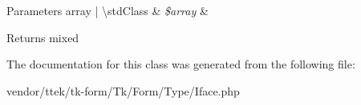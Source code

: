\begin{DoxyParams}[1]{Parameters}
array | \textbackslash{}std\+Class & {\em \$array} & \\
\hline
\end{DoxyParams}
\begin{DoxyReturn}{Returns}
mixed 
\end{DoxyReturn}


The documentation for this class was generated from the following file\+:\begin{DoxyCompactItemize}
\item 
vendor/ttek/tk-\/form/\+Tk/\+Form/\+Type/Iface.\+php\end{DoxyCompactItemize}
